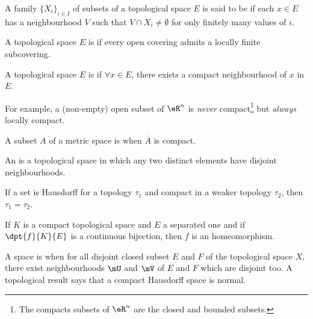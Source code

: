 \begin{definition}
  A family $\{ X_i \}_{i\in I}$ of subsets of a topological space $E$ is said to be  if each $x\in E$ has a neighbourhood $V$ such that $V\cap X_i \neq \emptyset$ for only finitely many values of $i$.
\end{definition}


\begin{definition}	\label{DefParacompact}
A topological space $E$ is  if every open covering admits a locally finite subcovering.
\end{definition}


\begin{definition}
A topological space $E$ is  if $\forall x\in E$, there exists a compact neighbourhood of $x$ in $E$.
\end{definition}

For example, a (non-empty) open subset of $\eR^n$ is \emph{never} compact\footnote{The compacts subsets of $\eR^n$ are the closed and bounded subsets.} but \emph{always} locally compact.

\begin{definition}
A subset $A$ of a metric space is  when $\overline{A}$ is compact.
\end{definition}

\begin{definition}
An  is a topological space in which any two distinct elements have disjoint neighbourhoods.
\end{definition}

\begin{lemma}
If a set is Hausdorff for a topology $\tau_1$ and compact in a weaker topology $\tau_2$, then $\tau_1=\tau_2$.\label{lem:Hausweak}
\end{lemma}

\begin{proposition}
If $K$ is a compact topological space and $E$ a separated one and if $\dpt{f}{K}{E}$ is a continuous bijection, then $f$ is an homeomorphism. \label{lem:wiki}
\end{proposition}

A space is  when for all disjoint closed subset $E$ and $F$ of the topological space $X$, there exist neighbourhoods $\mU$ and $\mV$ of $E$ and $F$ which are disjoint too. A topological result says that a compact Hausdorff space is normal.

